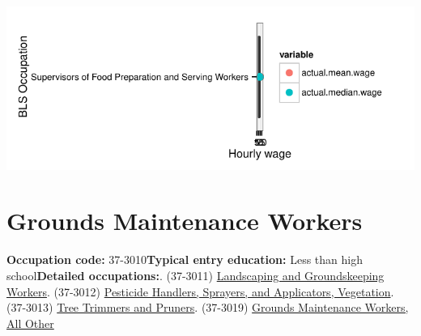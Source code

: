 \documentclass[a4paper,10pt]{article}\usepackage[]{graphicx}\usepackage[]{color}
\makeatletter
\def\maxwidth{ %
  \ifdim\Gin@nat@width>\linewidth
    \linewidth
  \else
    \Gin@nat@width
  \fi
}
\makeatother
\begin{document}
{\centering \includegraphics[width=\maxwidth]{figure/unnamed-chunk-232} 

}


\newpage\section{Grounds Maintenance Workers}\textbf{Occupation code:} 37-3010\newline\textbf{Typical entry education:} Less than high school\newline\textbf{Detailed occupations:}. (37-3011)  \href{http://www.bls.gov/oes/current/oes373011.htm}{Landscaping and Groundskeeping Workers}. (37-3012)  \href{http://www.bls.gov/oes/current/oes373012.htm}{Pesticide Handlers, Sprayers, and Applicators, Vegetation}. (37-3013)  \href{http://www.bls.gov/oes/current/oes373013.htm}{Tree Trimmers and Pruners}. (37-3019)  \href{http://www.bls.gov/oes/current/oes373019.htm}{Grounds Maintenance Workers, All Other}\newline%
\end{document}
